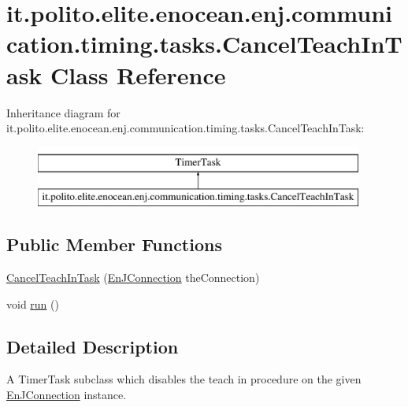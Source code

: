\hypertarget{classit_1_1polito_1_1elite_1_1enocean_1_1enj_1_1communication_1_1timing_1_1tasks_1_1_cancel_teach_in_task}{}\section{it.\+polito.\+elite.\+enocean.\+enj.\+communication.\+timing.\+tasks.\+Cancel\+Teach\+In\+Task Class Reference}
\label{classit_1_1polito_1_1elite_1_1enocean_1_1enj_1_1communication_1_1timing_1_1tasks_1_1_cancel_teach_in_task}
Inheritance diagram for it.\+polito.\+elite.\+enocean.\+enj.\+communication.\+timing.\+tasks.\+Cancel\+Teach\+In\+Task\+:\begin{figure}[H]
\begin{center}
\leavevmode
\includegraphics[height=2.000000cm]{classit_1_1polito_1_1elite_1_1enocean_1_1enj_1_1communication_1_1timing_1_1tasks_1_1_cancel_teach_in_task}
\end{center}
\end{figure}
\subsection*{Public Member Functions}
\begin{DoxyCompactItemize}
\item 
\hyperlink{classit_1_1polito_1_1elite_1_1enocean_1_1enj_1_1communication_1_1timing_1_1tasks_1_1_cancel_teach_in_task_a9bcf4c5d3eefc428376ba051a651e22a}{Cancel\+Teach\+In\+Task} (\hyperlink{classit_1_1polito_1_1elite_1_1enocean_1_1enj_1_1communication_1_1_en_j_connection}{En\+J\+Connection} the\+Connection)
\item 
void \hyperlink{classit_1_1polito_1_1elite_1_1enocean_1_1enj_1_1communication_1_1timing_1_1tasks_1_1_cancel_teach_in_task_a9391c37b46ed0750fcffbfb3b507657e}{run} ()
\end{DoxyCompactItemize}


\subsection{Detailed Description}
A Timer\+Task subclass which disables the teach in procedure on the given \hyperlink{classit_1_1polito_1_1elite_1_1enocean_1_1enj_1_1communication_1_1_en_j_connection}{En\+J\+Connection} instance.


